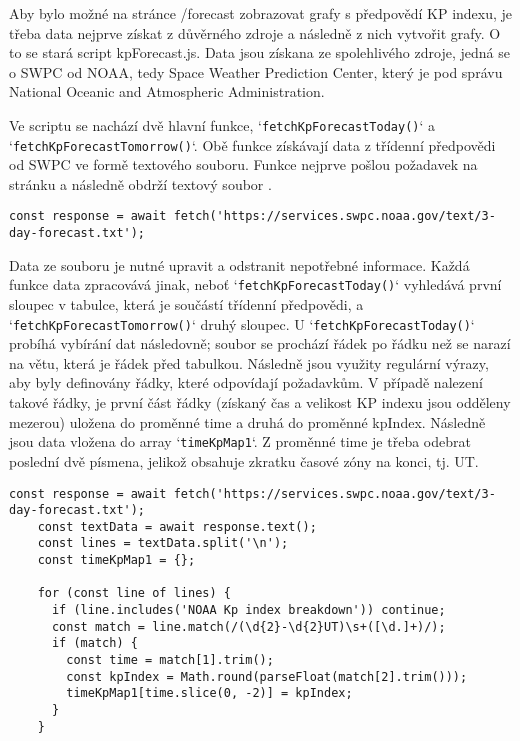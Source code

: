 \par Aby bylo možné na stránce /forecast zobrazovat grafy s předpovědí KP indexu, je třeba data nejprve získat z důvěrného zdroje a následně z nich vytvořit grafy. O to se stará script kpForecast.js. Data jsou získana ze spolehlivého zdroje, jedná se o SWPC od NOAA, tedy Space Weather Prediction Center, který je pod správu National Oceanic and Atmospheric Administration.
\par Ve scriptu se nachází dvě hlavní funkce, `\texttt{fetchKpForecastToday()}` a `\texttt{fetchKpForecastTomorrow()}`. Obě funkce získávají data z třídenní předpovědi od SWPC ve formě textového souboru. Funkce nejprve pošlou požadavek na stránku a následně obdrží textový soubor \cite{javascript_fetch_json}. 
\begin{lstlisting}[caption = {Získávání dat o KP indexu},label = {lst:stranka}]
    const response = await fetch('https://services.swpc.noaa.gov/text/3-day-forecast.txt');
\end{lstlisting}
\par Data ze souboru je nutné upravit a odstranit nepotřebné informace. Každá funkce data zpracovává jinak, neboť `\texttt{fetchKpForecastToday()}` vyhledává první sloupec v tabulce, která je součástí třídenní předpovědi, a `\texttt{fetchKpForecastTomorrow()}` druhý sloupec. U `\texttt{fetchKpForecastToday()}` probíhá vybírání dat následovně; soubor se prochází řádek po řádku než se narazí na větu, která je řádek před tabulkou. Následně jsou využity regulární výrazy, aby byly definovány řádky, které odpovídají požadavkům. V případě nalezení takové řádky, je první část řádky (získaný čas a velikost KP indexu jsou odděleny mezerou) uložena do proměnné time a druhá do proměnné kpIndex. Následně jsou data vložena do array `\texttt{timeKpMap1}`. Z proměnné time je třeba odebrat poslední dvě písmena, jelikož obsahuje zkratku časové zóny na konci, tj. UT.
\begin{lstlisting}[caption = {Třídění dat ze souboru forecast.txt a vkládání hodnot do timeKpMap1},label = {lst:stranka}]
    const response = await fetch('https://services.swpc.noaa.gov/text/3-day-forecast.txt');
    const textData = await response.text();
    const lines = textData.split('\n');
    const timeKpMap1 = {};

    for (const line of lines) {
      if (line.includes('NOAA Kp index breakdown')) continue;
      const match = line.match(/(\d{2}-\d{2}UT)\s+([\d.]+)/);
      if (match) {
        const time = match[1].trim();
        const kpIndex = Math.round(parseFloat(match[2].trim()));
        timeKpMap1[time.slice(0, -2)] = kpIndex;
      }
    }
\end{lstlisting}
